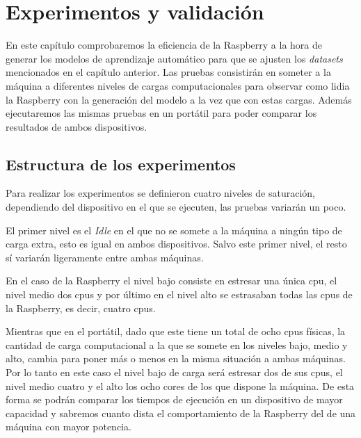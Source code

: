 \documentclass[a4paper, 12pt]{book}
\begin{document}
\cleardoublepage


\chapter{Experimentos y validación}
\label{chap:experimentos}

En este capítulo comprobaremos la eficiencia de la Raspberry a la hora de generar los modelos de aprendizaje automático para que se ajusten los \textit{datasets} mencionados en el capítulo anterior. Las pruebas consistirán en someter a la máquina a diferentes niveles de cargas computacionales para observar como lidia la Raspberry con la generación del modelo a la vez que con estas cargas.
Además ejecutaremos las mismas pruebas en un portátil para poder comparar los resultados de ambos dispositivos.

\section{Estructura de los experimentos}
\label{sec:estructura_experimentos}

Para realizar los experimentos se definieron cuatro niveles de saturación, dependiendo del dispositivo en el que se ejecuten, las pruebas variarán un poco. 

El primer nivel es el \textit{Idle} en el que no se somete a la máquina a ningún tipo de carga extra, esto es igual en ambos dispositivos. Salvo este primer nivel, el resto sí variarán ligeramente entre ambas máquinas.

En el caso de la Raspberry el nivel bajo consiste en estresar una única cpu, el nivel medio dos cpus y por último en el nivel alto se estrasaban todas las cpus de la Raspberry, es decir, cuatro cpus. 

Mientras que en el portátil, dado que este tiene un total de ocho cpus físicas, la cantidad de carga computacional a la que se somete en los niveles bajo, medio y alto, cambia para poner más o menos en la misma situación a ambas máquinas. Por lo tanto en este caso el nivel bajo de carga será estresar dos de sus cpus, el nivel medio cuatro y el alto los ocho cores de los que dispone la máquina. De esta forma se podrán comparar los tiempos de ejecución en un dispositivo de mayor capacidad y sabremos cuanto dista el comportamiento de la Raspberry del de una máquina con mayor potencia.
\end{document}
